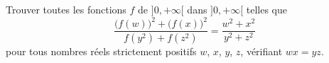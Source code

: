 Trouver toutes les fonctions $f$ de $]0, +\infty[$ dans $]0, +\infty[$ telles que
\[
\frac{\bigl(f(w)\bigr)^2 + \bigl(f(x)\bigr)^2}{f(y^2) + f(z^2)} = \frac{w^2 + x^2}{y^2 + z^2}
\]
pour tous nombres réels strictement positifs $w$, $x$, $y$, $z$, vérifiant $wx = yz$.
